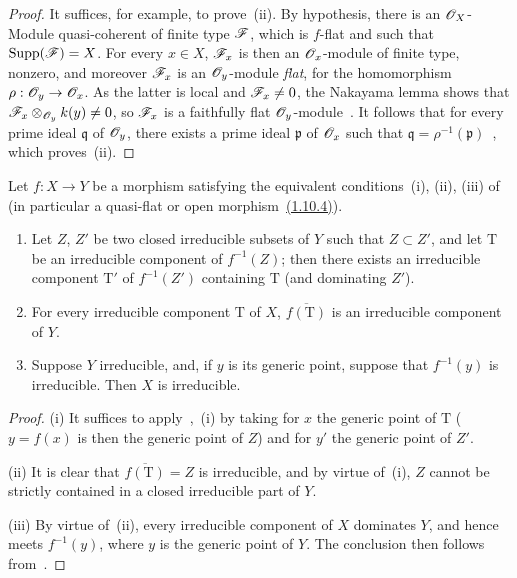 \begin{proof}
It suffices, for example, to prove~(ii).
By hypothesis, there is an $\mathscr{O}_X$-Module quasi-coherent of finite type $\mathscr{F}$, which is $f$-flat and such that $\operatorname{Supp}(\mathscr{F})=X$.
For every $x\in X$, $\mathscr{F}_x$ is then an $\mathscr{O}_x$-module of finite type, nonzero, and moreover $\mathscr{F}_x$ is an $\mathscr{O}_y$-module \emph{flat}, for the homomorphism $\rho:\mathscr{O}_y\to\mathscr{O}_x$.
As the latter is local and $\mathscr{F}_x\neq 0$, the Nakayama lemma shows that $\mathscr{F}_x\otimes_{\mathscr{O}_y}k(y)\neq 0$, so $\mathscr{F}_x$ is a faithfully flat $\mathscr{O}_y$-module~.
It follows that for every prime ideal $\mathfrak{q}$ of $\mathscr{O}_y$, there exists a prime ideal $\mathfrak{p}$ of $\mathscr{O}_x$ such that $\mathfrak{q}=\rho^{-1}(\mathfrak{p})$~, which proves~(ii).
\end{proof}

\begin{corollary}[2.3.5]
\label{IV.2.3.5}
Let $f:X\to Y$ be a morphism satisfying the equivalent conditions~(i), (ii), (iii) of~ \textnormal{(}in particular a quasi-flat or open morphism~{\hyperref[IV.1.10.4]{(1.10.4)}}\textnormal{)}.
\begin{enumerate}
  \item[(i)] Let $Z$, $Z'$ be two closed irreducible subsets of $Y$ such that $Z\subset Z'$, and let $\mathrm{T}$ be an irreducible component of $f^{-1}(Z)$; then there exists an irreducible component $\mathrm{T}'$ of $f^{-1}(Z')$ containing $\mathrm{T}$ \textnormal{(}and dominating $Z'$\textnormal{)}.
  \item[(ii)] For every irreducible component $\mathrm{T}$ of $X$, $\overline{f(\mathrm{T})}$ is an irreducible component of $Y$.
  \item[(iii)] Suppose $Y$ irreducible, and, if $y$ is its generic point, suppose that $f^{-1}(y)$ is irreducible. Then $X$ is irreducible.
\end{enumerate}
\end{corollary}

\begin{proof}
(i) It suffices to apply~,~(i) by taking for $x$ the generic point of $\mathrm{T}$ ($y=f(x)$ is then the generic point of $Z$) and for $y'$ the generic point of $Z'$.

(ii) It is clear that $\overline{f(\mathrm{T})}=Z$ is irreducible, and by virtue of~(i), $Z$ cannot be strictly contained in a closed irreducible part of $Y$.

(iii) By virtue of~(ii), every irreducible component of $X$ dominates $Y$, and hence meets $f^{-1}(y)$, where $y$ is the generic point of $Y$.
The conclusion then follows from~.
\end{proof}


